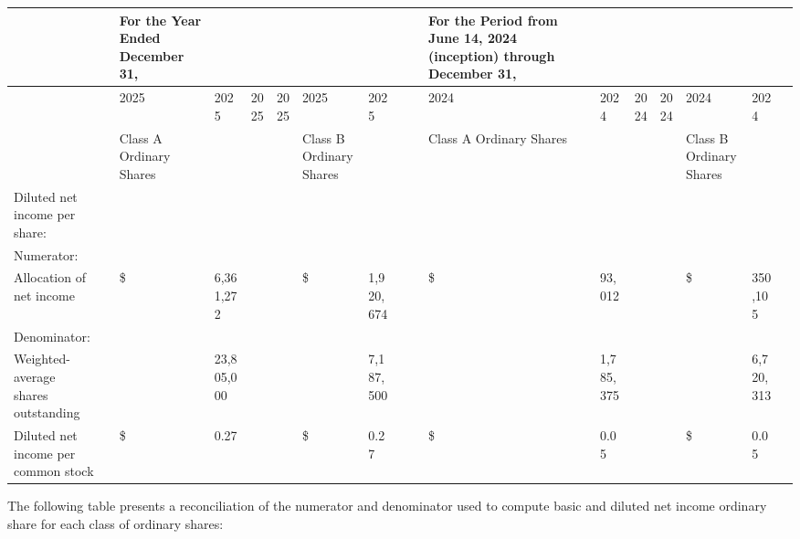 \documentclass[11pt,a4paper]{article}
\begin{document}
\begin{table}[h]
\begin{tabular}{|l|l|l|l|l|l|l|l|l|l|l|l|l|l|l|l|l|}
\hline
 &  & For the Year Ended December 31, &  &  &  &  &  &  &  & For the Period from June 14, 2024 (inception) through December 31, &  &  &  &  &  &  \\ \hline
 &  & 2025 & 2025 & 2025 & 2025 & 2025 & 2025 &  &  & 2024 & 2024 & 2024 & 2024 & 2024 & 2024 &  \\ \hline
 &  & Class A Ordinary Shares &  &  &  & Class B Ordinary Shares &  &  &  & Class A Ordinary Shares &  &  &  & Class B Ordinary Shares &  &  \\ \hline
Diluted net income per share: &  &  &  &  &  &  &  &  &  &  &  &  &  &  &  &  \\ \hline
Numerator: &  &  &  &  &  &  &  &  &  &  &  &  &  &  &  &  \\ \hline
Allocation of net income &  & \$ & 6,361,272 &  &  & \$ & 1,920,674 &  &  & \$ & 93,012 &  &  & \$ & 350,105 &  \\ \hline
Denominator: &  &  &  &  &  &  &  &  &  &  &  &  &  &  &  &  \\ \hline
Weighted-average shares outstanding &  &  & 23,805,000 &  &  &  & 7,187,500 &  &  &  & 1,785,375 &  &  &  & 6,720,313 &  \\ \hline
Diluted net income per common stock &  & \$ & 0.27 &  &  & \$ & 0.27 &  &  & \$ & 0.05 &  &  & \$ & 0.05 &  \\ \hline
\end{tabular}
\end{table}

The following table presents a reconciliation of the numerator and denominator used to compute basic and diluted net income ordinary share for each class of ordinary shares:
\end{document}
